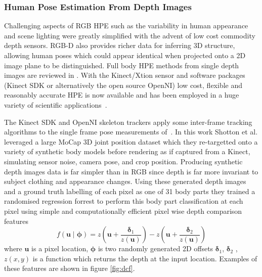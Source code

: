 \documentclass[11pt]{article} %
\begin{document}
\subsubsection{Human Pose Estimation From Depth Images}

Challenging aspects of RGB HPE such as the variability in human appearance and scene lighting were greatly simplified with the advent of low cost commodity depth sensors. RGB-D also provides richer data for inferring 3D structure, allowing human poses which could appear identical when projected onto a 2D image plane to be distinguished. Full body HPE methods from single depth images are reviewed in \cite{Helten2013}. With the Kinect/Xtion sensor and software packages (Kinect SDK or alternatively the open source OpenNI) low cost, flexible and reasonably accurate HPE is now available and has been employed in a huge variety of scientific applications~\cite{Han2013,Giovanni}.

The Kinect SDK and OpenNI skeleton trackers apply some inter-frame tracking algorithms to the single frame pose measurements of~\cite{Shotton2011}. In this work Shotton et al. leveraged a large MoCap 3D joint position dataset which they re-targetted onto a variety of synthetic body models before rendering as if captured from a Kinect, simulating sensor noise, camera pose, and crop position. Producing synthetic depth images data is far simpler than in RGB since depth is far more invariant to subject clothing and appearance changes. Using these generated depth images and a ground truth labelling of each pixel as one of 31 body parts they trained a randomised regression forrest to perform this body part classification at each pixel using simple and computationally efficient pixel wise depth comparison features 
\begin{equation}
f(\boldsymbol{u} \mid \boldsymbol{\phi}) = z(\boldsymbol{u}+\frac{\boldsymbol{\delta}_1}{z(\boldsymbol{u})})-z(\boldsymbol{u}+\frac{\boldsymbol{\delta}_2}{z(\boldsymbol{u})})
\label{eq:dcf}
\end{equation}
where $\boldsymbol{u}$ is a pixel location, $\boldsymbol{\phi}$ is two randomly generated 2D offsets $\boldsymbol{\delta}_1$, $\boldsymbol{\delta}_2$ , $z(x,y)$ is a function which returns the depth at the input location. Examples of these features are shown in figure \ref{fig:dcf}.
\end{document}
